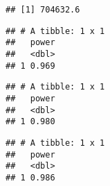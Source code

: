 \documentclass[]{article}
\newenvironment{Shaded}{\begin{snugshade}}{\end{snugshade}}
\newcommand{\KeywordTok}[1]{\textcolor[rgb]{0.13,0.29,0.53}{\textbf{#1}}}
\newcommand{\DataTypeTok}[1]{\textcolor[rgb]{0.13,0.29,0.53}{#1}}
\newcommand{\DecValTok}[1]{\textcolor[rgb]{0.00,0.00,0.81}{#1}}
\newcommand{\FloatTok}[1]{\textcolor[rgb]{0.00,0.00,0.81}{#1}}
\newcommand{\StringTok}[1]{\textcolor[rgb]{0.31,0.60,0.02}{#1}}
\newcommand{\OperatorTok}[1]{\textcolor[rgb]{0.81,0.36,0.00}{\textbf{#1}}}
\newcommand{\NormalTok}[1]{#1}
\begin{document}
\begin{verbatim}
## [1] 704632.6
\end{verbatim}

\begin{Shaded}
\end{Shaded}

\begin{verbatim}
## # A tibble: 1 x 1
##   power
##   <dbl>
## 1 0.969
\end{verbatim}

\begin{Shaded}
\end{Shaded}

\begin{verbatim}
## # A tibble: 1 x 1
##   power
##   <dbl>
## 1 0.980
\end{verbatim}

\begin{Shaded}
\end{Shaded}

\begin{verbatim}
## # A tibble: 1 x 1
##   power
##   <dbl>
## 1 0.986
\end{verbatim}
\end{document}
